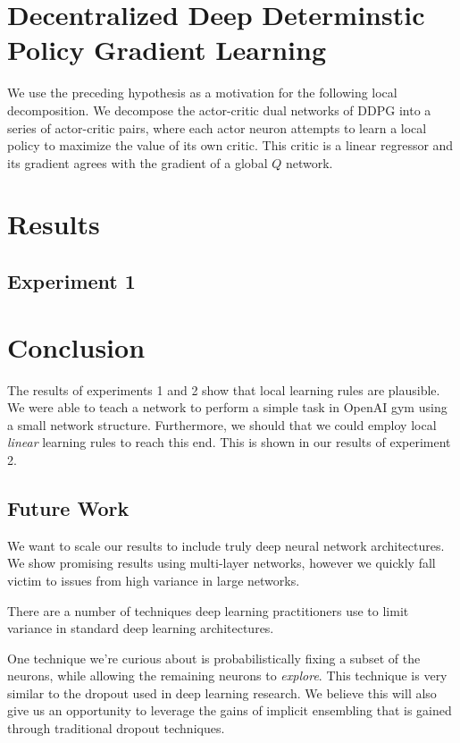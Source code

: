 \documentclass{article} %
\numberwithin{equation}{subsection}
\numberwithin{theorem}{subsection}
\theoremstyle{named}
\begin{document}
\section{Decentralized Deep Determinstic Policy Gradient Learning}
We use the preceding hypothesis as a motivation for the following local decomposition. We decompose the actor-critic dual networks of DDPG into a series of actor-critic pairs, where each actor neuron attempts to learn a local policy to maximize the value of its own critic. This critic is a linear regressor and its gradient agrees with the gradient of a global $Q$ network.



\section{Results}

\subsection{Experiment 1}



\section{Conclusion}
The results of experiments 1 and 2 show that local learning rules are plausible. We were able to teach a network to perform a simple task in OpenAI gym using a small network structure. Furthermore, we should that we could employ local \emph{linear} learning rules to reach this end. This is shown in our results of experiment 2. 
\subsection{Future Work}
We want to scale our results to include truly deep neural network architectures. We show promising results using multi-layer networks, however we quickly fall victim to issues from high variance in large networks.

There are a number of techniques deep learning practitioners use to limit variance in standard deep learning architectures. 

One technique we're curious about is probabilistically fixing a subset of the neurons, while allowing the remaining neurons to \emph{explore}. This technique is very similar to the dropout used in deep learning research. We believe this will also give us an opportunity to leverage the gains of implicit ensembling that is gained through traditional dropout techniques.




\printbibliography

%
\end{document}
